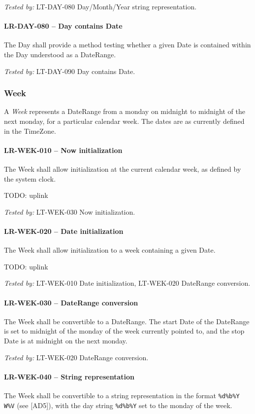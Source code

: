 \textit{Tested by: } LT-DAY-080 Day/Month/Year string representation.

\paragraph{LR-DAY-080 -- Day contains Date}
The Day shall provide a method testing whether a given Date is contained
within the Day understood as a DateRange.

\textit{Tested by: } LT-DAY-090 Day contains Date.

\subsubsection{Week}
A \emph{Week} represents a DateRange from a monday on midnight to midnight of
the next monday, for a particular calendar week.
The dates are as currently defined in the TimeZone.

\paragraph{LR-WEK-010 -- Now initialization}
The Week shall allow initialization at the current calendar week, as defined by
the system clock.

TODO: uplink

\textit{Tested by: } LT-WEK-030 Now initialization.

\paragraph{LR-WEK-020 -- Date initialization}
The Week shall allow initialization to a week containing a given Date.

TODO: uplink

\textit{Tested by: } LT-WEK-010 Date initialization,
LT-WEK-020 DateRange conversion.

\paragraph{LR-WEK-030 -- DateRange conversion}
The Week shall be convertible to a DateRange. The start Date of the DateRange
is set to midnight of the monday of the week currently pointed to, and the
stop Date is at midnight on the next monday.

\textit{Tested by: } LT-WEK-020 DateRange conversion.

\paragraph{LR-WEK-040 -- String representation}
The Week shall be convertible to a string representation in the format
\lstinline{%d%b%Y W%V} (see [AD5]), with the day string \lstinline{%d%b%Y}
set to the monday of the week.

